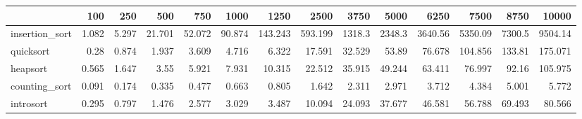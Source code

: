 \documentclass[12pt, a4paper]{article}
\begin{document}
\begin{tabular}{lrrrrrrrrrrrrr}
    \hline
                    &   100 &   250 &    500 &    750 &   1000 &    1250 &    2500 &     3750 &     5000 &     6250 &     7500 &     8750 &    10000 \\
    \hline
        insertion\_sort & 1.082 & 5.297 & 21.701 & 52.072 & 90.874 & 143.243 & 593.199 & 1318.3   & 2348.3   & 3640.56  & 5350.09  & 7300.5   & 9504.14  \\
        quicksort      & 0.28  & 0.874 &  1.937 &  3.609 &  4.716 &   6.322 &  17.591 &   32.529 &   53.89  &   76.678 &  104.856 &  133.81  &  175.071 \\
        heapsort       & 0.565 & 1.647 &  3.55  &  5.921 &  7.931 &  10.315 &  22.512 &   35.915 &   49.244 &   63.411 &   76.997 &   92.16  &  105.975 \\
        counting\_sort  & 0.091 & 0.174 &  0.335 &  0.477 &  0.663 &   0.805 &   1.642 &    2.311 &    2.971 &    3.712 &    4.384 &    5.001 &    5.772 \\
        introsort      & 0.295 & 0.797 &  1.476 &  2.577 &  3.029 &   3.487 &  10.094 &   24.093 &   37.677 &   46.581 &   56.788 &   69.493 &   80.566 \\
    \hline
\end{tabular}
        



\end{document}
